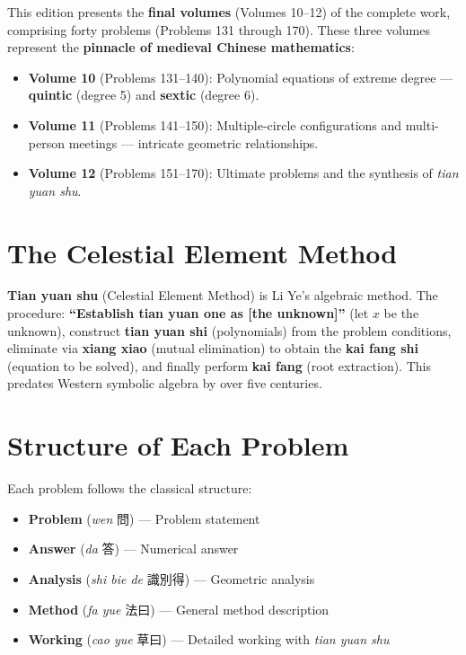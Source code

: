 \documentclass[11pt,a4paper]{book}
\begin{document}
This edition presents the \textbf{final volumes} (Volumes 10--12) of the complete work, comprising forty problems (Problems 131 through 170). These three volumes represent the \textbf{pinnacle of medieval Chinese mathematics}:

\begin{itemize}[leftmargin=2em]
  \item \textbf{Volume 10} (Problems 131--140): Polynomial equations of extreme degree --- \textbf{quintic} (degree 5) and \textbf{sextic} (degree 6).
  \item \textbf{Volume 11} (Problems 141--150): Multiple-circle configurations and multi-person meetings --- intricate geometric relationships.
  \item \textbf{Volume 12} (Problems 151--170): Ultimate problems and the synthesis of \textit{tian yuan shu}.
\end{itemize}

\section*{The Celestial Element Method}

\textbf{Tian yuan shu} (Celestial Element Method) is Li Ye's algebraic method. The procedure: \textbf{``Establish tian yuan one as [the unknown]''} (let $x$ be the unknown), construct \textbf{tian yuan shi} (polynomials) from the problem conditions, eliminate via \textbf{xiang xiao} (mutual elimination) to obtain the \textbf{kai fang shi} (equation to be solved), and finally perform \textbf{kai fang} (root extraction). This predates Western symbolic algebra by over five centuries.

\section*{Structure of Each Problem}

Each problem follows the classical structure:
\begin{itemize}[leftmargin=2em]
  \item \textbf{Problem} (\textit{wen} 問) --- Problem statement
  \item \textbf{Answer} (\textit{da} 答) --- Numerical answer
  \item \textbf{Analysis} (\textit{shi bie de} 識別得) --- Geometric analysis
  \item \textbf{Method} (\textit{fa yue} 法曰) --- General method description
  \item \textbf{Working} (\textit{cao yue} 草曰) --- Detailed working with \textit{tian yuan shu}
\end{itemize}
\end{document}
